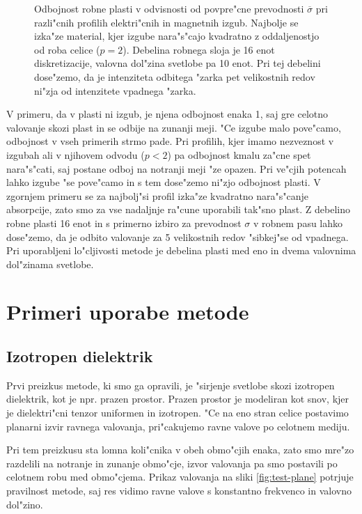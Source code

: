 \documentclass[12pt,twoside,openright,final,a4paper]{report}
\begin{document}
\begin{figure}[!ht]
 
 \caption{Odbojnost robne plasti v odvisnosti od povpre"cne prevodnosti $\overline{\sigma}$ pri razli"cnih profilih elektri"cnih in magnetnih izgub. Najbolje se izka"ze material, kjer izgube nara"s"cajo kvadratno z oddaljenostjo od roba celice ($p=2$). Debelina robnega sloja je 16 enot diskretizacije, valovna dol"zina svetlobe pa 10 enot. Pri tej debelini dose"zemo, da je intenziteta odbitega "zarka pet velikostnih redov ni"zja od intenzitete vpadnega "zarka. }
 \label{fig:test-absorption}
\end{figure}

V primeru, da v plasti ni izgub, je njena odbojnost enaka 1, saj gre celotno valovanje skozi plast in se odbije na zunanji meji. 
"Ce izgube malo pove"camo, odbojnost v vseh primerih strmo pade. 
Pri profilih, kjer imamo nezveznost v izgubah ali v njihovem odvodu ($p<2$) pa odbojnost kmalu za"cne spet nara"s"cati, saj postane odboj na notranji meji "ze opazen.
Pri ve"cjih potencah lahko izgube "se pove"camo in s tem dose"zemo ni"zjo odbojnost plasti. 
V zgornjem primeru se za najbolj"si profil izka"ze kvadratno nara"s"canje absorpcije, zato smo za vse nadaljnje ra"cune uporabili tak"sno plast. 
Z debelino robne plasti 16 enot in s primerno izbiro za prevodnost $\sigma$ v robnem pasu lahko dose"zemo, da je odbito valovanje za 5 velikostnih redov "sibkej"se od vpadnega. 
Pri uporabljeni lo"cljivosti metode je debelina plasti med eno in dvema valovnima dol"zinama svetlobe. 

\chapter{Primeri uporabe metode}

\section{Izotropen dielektrik}
Prvi preizkus metode, ki smo ga opravili, je "sirjenje svetlobe skozi izotropen dielektrik, kot je npr. prazen prostor. 
Prazen prostor je modeliran kot snov, kjer je dielektri"cni tenzor uniformen in izotropen. 
"Ce na eno stran celice postavimo planarni izvir ravnega valovanja, pri"cakujemo ravne valove po celotnem mediju. 

Pri tem preizkusu sta lomna koli"cnika v obeh obmo"cjih enaka, zato smo mre"zo razdelili na notranje in zunanje obmo"cje, izvor valovanja pa smo postavili po celotnem robu med obmo"cjema. 
Prikaz valovanja na sliki \ref{fig:test-plane} potrjuje pravilnost metode, saj res vidimo ravne valove s konstantno frekvenco in valovno dol"zino. 
\end{document}
